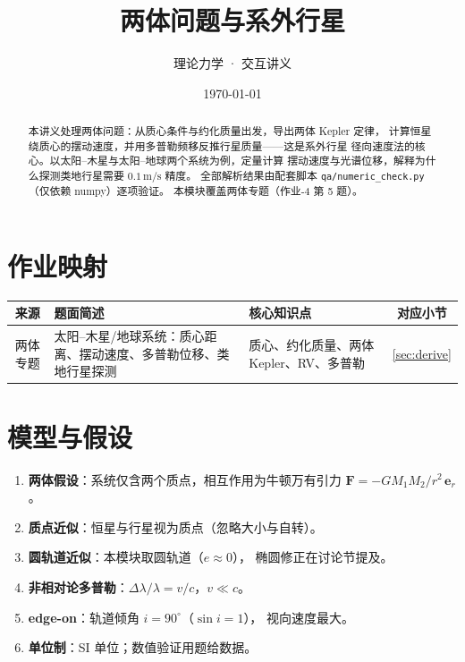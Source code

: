 \documentclass[UTF8,a4paper,11pt]{ctexart}
\title{\textbf{两体问题与系外行星}}
\author{理论力学 · 交互讲义}
\date{\today}
\begin{document}
\maketitle

\begin{abstract}
本讲义处理两体问题：从质心条件与约化质量出发，导出两体 Kepler 定律，
计算恒星绕质心的摆动速度，并用多普勒频移反推行星质量——这是系外行星
径向速度法的核心。以太阳--木星与太阳--地球两个系统为例，定量计算
摆动速度与光谱位移，解释为什么探测类地行星需要 $0.1\,\mathrm{m/s}$ 精度。
全部解析结果由配套脚本 \texttt{qa/numeric\_check.py}（仅依赖 numpy）逐项验证。
本模块覆盖两体专题（作业-4 第 5 题）。
\end{abstract}

\tableofcontents
\newpage

\section{作业映射}
\label{sec:map}

\begin{center}
\small
\begin{tabular}{cp{7cm}p{3cm}c}
\toprule
来源 & 题面简述 & 核心知识点 & 对应小节 \\
\midrule
两体专题 & 太阳--木星/地球系统：质心距离、摆动速度、多普勒位移、类地行星探测 &
  质心、约化质量、两体 Kepler、RV、多普勒 & \ref{sec:derive} \\
\bottomrule
\end{tabular}
\end{center}

\section{模型与假设}
\label{sec:model}

\begin{enumerate}
  \item \textbf{两体假设}：系统仅含两个质点，相互作用为牛顿万有引力
        $\boldsymbol F=-GM_1M_2/r^2\,\boldsymbol e_r$。
  \item \textbf{质点近似}：恒星与行星视为质点（忽略大小与自转）。
  \item \textbf{圆轨道近似}：本模块取圆轨道（$e\approx0$），
        椭圆修正在讨论节提及。
  \item \textbf{非相对论多普勒}：$\Delta\lambda/\lambda=v/c$，$v\ll c$。
  \item \textbf{edge-on}：轨道倾角 $i=90^\circ$（$\sin i=1$），
        视向速度最大。
  \item \textbf{单位制}：SI 单位；数值验证用题给数据。
\end{enumerate}
\end{document}

